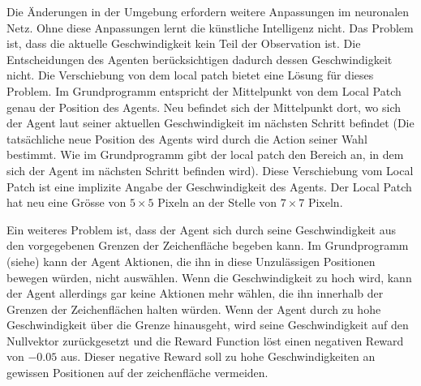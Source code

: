 Die Änderungen in der Umgebung erfordern weitere Anpassungen im neuronalen Netz.
Ohne diese Anpassungen lernt die künstliche Intelligenz nicht. Das Problem ist,
dass die aktuelle Geschwindigkeit kein Teil der Observation ist. Die
Entscheidungen des Agenten berücksichtigen dadurch dessen Geschwindigkeit nicht.
Die Verschiebung von dem local patch bietet eine Lösung für dieses Problem. Im
Grundprogramm entspricht der Mittelpunkt von dem Local Patch genau der Position
des Agents. Neu befindet sich der Mittelpunkt dort, wo sich der Agent laut
seiner aktuellen Geschwindigkeit im nächsten Schritt befindet (Die tatsächliche
neue Position des Agents wird durch die Action seiner Wahl bestimmt. Wie im
Grundprogramm gibt der local patch den Bereich an, in dem sich der Agent im
nächsten Schritt befinden wird). Diese Verschiebung vom Local Patch ist eine
implizite Angabe der Geschwindigkeit des Agents. Der Local Patch hat neu eine
Grösse von $5\times5$ Pixeln an der Stelle von $7\times7$ Pixeln.


Ein weiteres Problem ist, dass der Agent sich durch seine Geschwindigkeit aus
den vorgegebenen Grenzen der Zeichenfläche begeben kann. Im Grundprogramm  
(siehe) kann der Agent Aktionen, die ihn in diese Unzulässigen Positionen  %
bewegen würden, nicht auswählen. Wenn die Geschwindigkeit zu hoch wird, kann der
Agent allerdings gar keine Aktionen mehr wählen, die ihn innerhalb der Grenzen der
Zeichenflächen halten würden. Wenn der Agent durch zu hohe Geschwindigkeit über
die Grenze hinausgeht, wird seine Geschwindigkeit auf den Nullvektor
zurückgesetzt und die Reward Function löst einen negativen Reward von $-0.05$
aus. Dieser negative Reward soll zu hohe Geschwindigkeiten an gewissen
Positionen auf der zeichenfläche vermeiden.